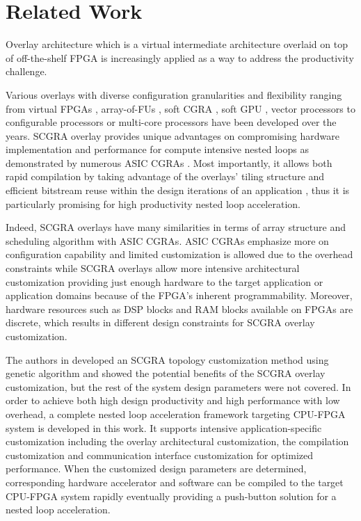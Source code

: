 \section{Related Work} \label{sec:relatedwork}
Overlay architecture which is a virtual intermediate architecture overlaid on 
top of off-the-shelf FPGA is increasingly applied as a way to address the 
productivity challenge. 

Various overlays with diverse configuration granularities and flexibility 
ranging from virtual FPGAs \cite{Grant2011Malibu, ZUMA2012}, 
array-of-FUs \cite{mesh-FUs,ferreira2011fpga}, soft 
CGRA \cite{kissler2006dynamically, scgra}, soft GPU \cite{Guppy2012GPU-Like}, 
vector processors\cite{Yiannacouras2009FPS, MXP2013} to 
configurable processors or multi-core processors \cite{unnikrishnan2009application, 
MARC2010, Yiannacouras2007Exploration, Capalija2009coarse-grain, OCTAVO2012, iDEA2012} 
have been developed over the years. SCGRA overlay provides unique 
advantages on compromising hardware implementation 
and performance for compute intensive nested loops as demonstrated 
by numerous ASIC CGRAs \cite{tessier2001reconfigurable, compton2002reconfigurable}.
Most importantly, it allows both rapid compilation by taking advantage of 
the overlays' tiling structure \cite{ROB2014} and efficient bitstream 
reuse within the design iterations of an application \cite{scgra}, 
thus it is particularly promising for high productivity nested loop acceleration.

Indeed, SCGRA overlays have many similarities in terms of array structure 
and scheduling algorithm with ASIC CGRAs. ASIC CGRAs emphasize 
more on configuration capability and limited customization is allowed due 
to the overhead constraints \cite{zhou2014application, miniskar2014retargetable} 
while SCGRA overlays allow more intensive architectural customization providing just enough hardware
to the target application or application domains 
because of the FPGA's inherent programmability. Moreover, hardware resources such as 
DSP blocks and RAM blocks available on FPGAs are discrete, which results in different 
design constraints for SCGRA overlay customization. 

The authors in \cite{colinheart} developed an SCGRA topology customization method using 
genetic algorithm and showed the potential benefits of the SCGRA overlay customization, 
but the rest of the system design parameters were not covered.
In order to achieve both high design productivity and high performance with low overhead,  
a complete nested loop acceleration framework targeting CPU-FPGA system 
is developed in this work. It supports intensive application-specific
customization including the overlay architectural customization, 
the compilation customization and communication interface customization 
for optimized performance. When the customized design parameters are determined, 
corresponding hardware accelerator and software can be compiled to the target 
CPU-FPGA system rapidly eventually providing a push-button solution for a nested loop 
acceleration. 



